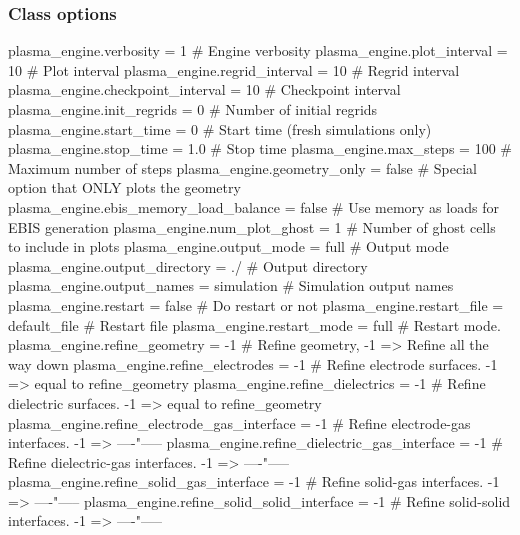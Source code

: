 \subsubsection*{Class options }

\begin{DoxyVerb}plasma_engine.verbosity                       = 1             # Engine verbosity
plasma_engine.plot_interval                   = 10            # Plot interval
plasma_engine.regrid_interval                 = 10            # Regrid interval
plasma_engine.checkpoint_interval             = 10            # Checkpoint interval
plasma_engine.init_regrids                    = 0             # Number of initial regrids
plasma_engine.start_time                      = 0             # Start time (fresh simulations only)
plasma_engine.stop_time                       = 1.0           # Stop time
plasma_engine.max_steps                       = 100           # Maximum number of steps
plasma_engine.geometry_only                   = false         # Special option that ONLY plots the geometry
plasma_engine.ebis_memory_load_balance        = false         # Use memory as loads for EBIS generation
plasma_engine.num_plot_ghost                  = 1             # Number of ghost cells to include in plots
plasma_engine.output_mode                     = full          # Output mode
plasma_engine.output_directory                = ./            # Output directory
plasma_engine.output_names                    = simulation    # Simulation output names
plasma_engine.restart                         = false         # Do restart or not
plasma_engine.restart_file                    = default_file  # Restart file
plasma_engine.restart_mode                    = full          # Restart mode. 
plasma_engine.refine_geometry                 = -1            # Refine geometry, -1 => Refine all the way down
plasma_engine.refine_electrodes               = -1            # Refine electrode surfaces. -1 => equal to refine_geometry
plasma_engine.refine_dielectrics              = -1            # Refine dielectric surfaces. -1 => equal to refine_geometry
plasma_engine.refine_electrode_gas_interface  = -1            # Refine electrode-gas interfaces. -1 => ----"-----
plasma_engine.refine_dielectric_gas_interface = -1            # Refine dielectric-gas interfaces. -1 => ----"-----
plasma_engine.refine_solid_gas_interface      = -1            # Refine solid-gas interfaces. -1 => ----"-----
plasma_engine.refine_solid_solid_interface    = -1            # Refine solid-solid interfaces. -1 => ----"-----\end{DoxyVerb}
 

